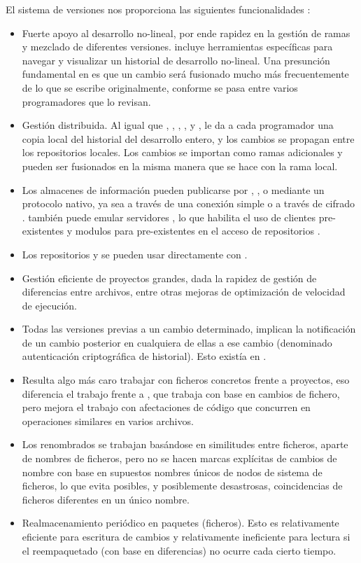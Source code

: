El sistema de versiones  nos proporciona las siguientes
funcionalidades \cite{wiki:GIT}:

\begin{itemize}
\item Fuerte apoyo al desarrollo no-lineal, por ende rapidez en la gestión de
  ramas y mezclado de diferentes versiones.  incluye herramientas
  específicas para navegar y visualizar un historial de desarrollo
  no-lineal. Una presunción fundamental en  es que un cambio será
  fusionado mucho más frecuentemente de lo que se escribe originalmente,
  conforme se pasa entre varios programadores que lo revisan.
\item Gestión distribuida. Al igual que , ,
  , ,  y ,
   le da a cada programador una copia local del historial del
  desarrollo entero, y los cambios se propagan entre los repositorios
  locales. Los cambios se importan como ramas adicionales y pueden ser
  fusionados en la misma manera que se hace con la rama local.
\item Los almacenes de información pueden publicarse por ,
  ,  o mediante un protocolo nativo, ya sea a través
  de una conexión  simple o a través de cifrado
  .  también puede emular servidores , lo
  que habilita el uso de clientes  pre-existentes y modulos
   para  pre-existentes en el acceso de repositorios
  .
\item Los repositorios  y  se pueden usar
  directamente con .
\item Gestión eficiente de proyectos grandes, dada la rapidez de gestión de
  diferencias entre archivos, entre otras mejoras de optimización de velocidad
  de ejecución.
\item Todas las versiones previas a un cambio determinado, implican la
  notificación de un cambio posterior en cualquiera de ellas a ese cambio
  (denominado autenticación criptográfica de historial). Esto existía en
  .
\item Resulta algo más caro trabajar con ficheros concretos frente a proyectos,
  eso diferencia el trabajo frente a , que trabaja con base en
  cambios de fichero, pero mejora el trabajo con afectaciones de código que
  concurren en operaciones similares en varios archivos.
\item Los renombrados se trabajan basándose en similitudes entre ficheros,
  aparte de nombres de ficheros, pero no se hacen marcas explícitas de cambios
  de nombre con base en supuestos nombres únicos de nodos de sistema de
  ficheros, lo que evita posibles, y posiblemente desastrosas, coincidencias de
  ficheros diferentes en un único nombre.
\item Realmacenamiento periódico en paquetes (ficheros). Esto es relativamente
  eficiente para escritura de cambios y relativamente ineficiente para lectura
  si el reempaquetado (con base en diferencias) no ocurre cada cierto tiempo.
\end{itemize}

